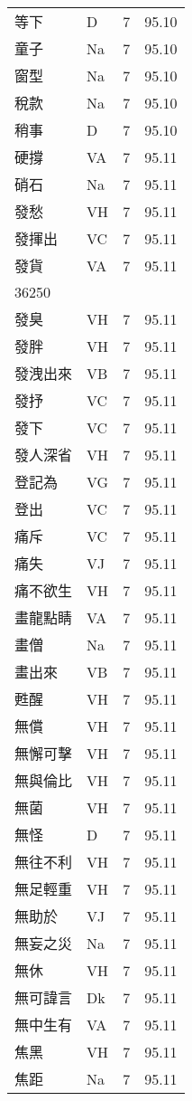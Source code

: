 \documentclass[twocolumn]{book}
\begin{document}
\begin{supertabular}{llrr}
等下 & D & 7 &  95.10\\
童子 & Na & 7 &  95.10\\
窗型 & Na & 7 &  95.10\\
稅款 & Na & 7 &  95.10\\
稍事 & D & 7 &  95.10\\
硬撐 & VA & 7 &  95.11\\
硝石 & Na & 7 &  95.11\\
發愁 & VH & 7 &  95.11\\
發揮出 & VC & 7 &  95.11\\
發貨 & VA & 7 &  95.11\\
36250\\
發臭 & VH & 7 &  95.11\\
發胖 & VH & 7 &  95.11\\
發洩出來 & VB & 7 &  95.11\\
發抒 & VC & 7 &  95.11\\
發下 & VC & 7 &  95.11\\
發人深省 & VH & 7 &  95.11\\
登記為 & VG & 7 &  95.11\\
登出 & VC & 7 &  95.11\\
痛斥 & VC & 7 &  95.11\\
痛失 & VJ & 7 &  95.11\\
痛不欲生 & VH & 7 &  95.11\\
畫龍點睛 & VA & 7 &  95.11\\
畫僧 & Na & 7 &  95.11\\
畫出來 & VB & 7 &  95.11\\
甦醒 & VH & 7 &  95.11\\
無償 & VH & 7 &  95.11\\
無懈可擊 & VH & 7 &  95.11\\
無與倫比 & VH & 7 &  95.11\\
無菌 & VH & 7 &  95.11\\
無怪 & D & 7 &  95.11\\
無往不利 & VH & 7 &  95.11\\
無足輕重 & VH & 7 &  95.11\\
無助於 & VJ & 7 &  95.11\\
無妄之災 & Na & 7 &  95.11\\
無休 & VH & 7 &  95.11\\
無可諱言 & Dk & 7 &  95.11\\
無中生有 & VA & 7 &  95.11\\
焦黑 & VH & 7 &  95.11\\
焦距 & Na & 7 &  95.11\\

\end{supertabular}
\end{document}
